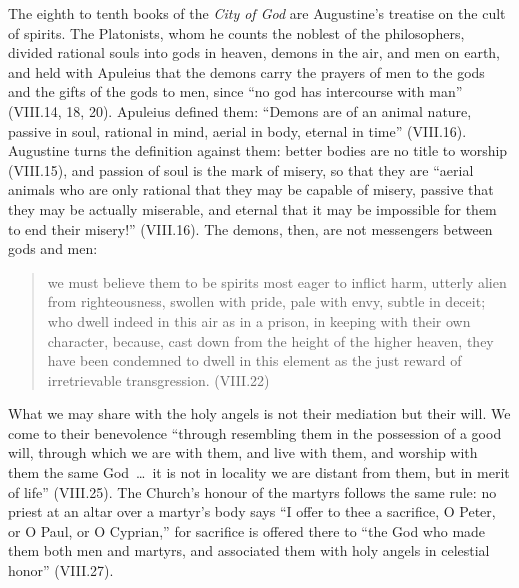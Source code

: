 The eighth to tenth books of the \emph{City of God} are Augustine's
treatise on the cult of spirits. The Platonists, whom he counts the
noblest of the philosophers, divided rational souls into gods in heaven,
demons in the air, and men on earth, and held with Apuleius that the
demons carry the prayers of men to the gods and the gifts of the gods to
men, since ``no god has intercourse with man'' (VIII.14, 18, 20).
Apuleius defined them: ``Demons are of an animal nature, passive in soul,
rational in mind, aerial in body, eternal in time'' (VIII.16). Augustine
turns the definition against them: better bodies are no title to worship
(VIII.15), and passion of soul is the mark of misery, so that they are
``aerial animals who
are only rational that they may be capable of misery, passive that they
may be actually miserable, and eternal that it may be impossible for them
to end their misery!'' (VIII.16). The demons, then, are not messengers
between gods and men:
\begin{quote}
we must believe them to be spirits most eager to inflict harm, utterly
alien from righteousness, swollen with pride, pale with envy, subtle in
deceit; who dwell indeed in this air as in a prison, in keeping with
their own character, because, cast down from the height of the higher
heaven, they have been condemned to dwell in this element as the just
reward of irretrievable transgression. (VIII.22)
\end{quote}
What we may share with the holy angels is not their mediation but their
will. We come to their benevolence ``through resembling them in the
possession of a good will, through which we are with them, and live with
them, and worship with them the same God~\dots\ it is not in locality we
are distant from them, but in merit of life'' (VIII.25). The Church's honour of the martyrs
follows the same rule: no priest at an altar over a martyr's body says
``I offer to thee a sacrifice, O Peter, or O Paul, or O Cyprian,'' for
sacrifice is offered there to ``the God who made them both men and
martyrs, and associated them with holy angels in celestial honor''
(VIII.27).

